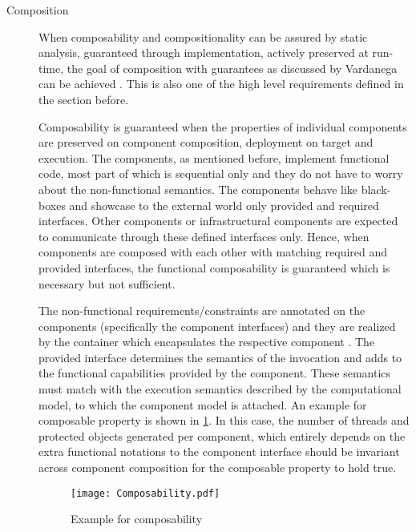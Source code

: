 \begin{description}
\item [Composition] 
\label{section: Founding principle-Composition}
When composability and compositionality can be assured by static analysis, guaranteed through implementation, actively preserved at run-time, the goal of composition with guarantees as discussed by Vardanega can be achieved \cite{CompBasedProcess}. This is also one of the high level requirements defined in the section before.
 
Composability is guaranteed when the properties of individual components are preserved on component composition, deployment on target and execution. The components, as mentioned before, implement functional code, most part of which is sequential only and they do not have to worry about the non-functional semantics. The components behave like black-boxes and showcase to the external world only provided and required interfaces. Other components or infrastructural components are expected to communicate through these defined interfaces only. Hence, when components are composed with each other with matching required and provided interfaces, the functional composability is guaranteed which is necessary but not sufficient.

The non-functional requirements/constraints are annotated on the components (specifically the component interfaces) and they are realized by the container which encapsulates the respective component \cite{SAVOIR,ComponentModel}. The provided interface determines the semantics of the invocation and adds to the functional capabilities provided by the component. These semantics must match with the execution semantics described by the computational model, to which the component model is attached. An example for composable property is shown in \cref{fig: Composability}. In this case, the number of threads and protected objects generated per component, which entirely depends on the extra functional notations to the component interface should be invariant across component composition for the composable property to hold true.  

\begin{figure}[h]
	\centering
	\texttt{[image: Composability.pdf]}
	\caption{Example for composability}
	\label{fig: Composability}
\end{figure}


\end{description}

